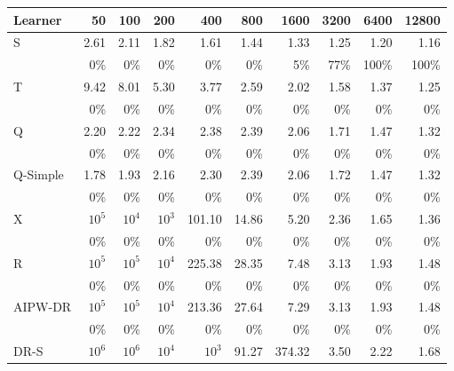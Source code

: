 \begin{tabular}{l|rrrrrrrrr}
\hline
Learner & 50 & 100 & 200 & 400 & 800 & 1600 & 3200 & 6400 & 12800 \\
\hline
S & 2.61 & 2.11 & 1.82 & 1.61 & 1.44 & 1.33 & 1.25 & 1.20 & 1.16 \\
 & \scriptsize 0\% & \scriptsize 0\% & \scriptsize 0\% & \scriptsize 0\% & \scriptsize 0\% & \scriptsize 5\% & \scriptsize 77\% & \scriptsize 100\% & \scriptsize 100\% \\[2pt]
T & 9.42 & 8.01 & 5.30 & 3.77 & 2.59 & 2.02 & 1.58 & 1.37 & 1.25 \\
 & \scriptsize 0\% & \scriptsize 0\% & \scriptsize 0\% & \scriptsize 0\% & \scriptsize 0\% & \scriptsize 0\% & \scriptsize 0\% & \scriptsize 0\% & \scriptsize 0\% \\[2pt]
\hline
Q & 2.20 & 2.22 & 2.34 & 2.38 & 2.39 & 2.06 & 1.71 & 1.47 & 1.32 \\
 & \scriptsize 0\% & \scriptsize 0\% & \scriptsize 0\% & \scriptsize 0\% & \scriptsize 0\% & \scriptsize 0\% & \scriptsize 0\% & \scriptsize 0\% & \scriptsize 0\% \\[2pt]
Q-Simple & 1.78 & 1.93 & 2.16 & 2.30 & 2.39 & 2.06 & 1.72 & 1.47 & 1.32 \\
 & \scriptsize 0\% & \scriptsize 0\% & \scriptsize 0\% & \scriptsize 0\% & \scriptsize 0\% & \scriptsize 0\% & \scriptsize 0\% & \scriptsize 0\% & \scriptsize 0\% \\[2pt]
\hline
X & $10^{5}$ & $10^{4}$ & $10^{3}$ & 101.10 & 14.86 & 5.20 & 2.36 & 1.65 & 1.36 \\
 & \scriptsize 0\% & \scriptsize 0\% & \scriptsize 0\% & \scriptsize 0\% & \scriptsize 0\% & \scriptsize 0\% & \scriptsize 0\% & \scriptsize 0\% & \scriptsize 0\% \\[2pt]
R & $10^{5}$ & $10^{5}$ & $10^{4}$ & 225.38 & 28.35 & 7.48 & 3.13 & 1.93 & 1.48 \\
 & \scriptsize 0\% & \scriptsize 0\% & \scriptsize 0\% & \scriptsize 0\% & \scriptsize 0\% & \scriptsize 0\% & \scriptsize 0\% & \scriptsize 0\% & \scriptsize 0\% \\[2pt]
AIPW-DR & $10^{5}$ & $10^{5}$ & $10^{4}$ & 213.36 & 27.64 & 7.29 & 3.13 & 1.93 & 1.48 \\
 & \scriptsize 0\% & \scriptsize 0\% & \scriptsize 0\% & \scriptsize 0\% & \scriptsize 0\% & \scriptsize 0\% & \scriptsize 0\% & \scriptsize 0\% & \scriptsize 0\% \\[2pt]
\hline
DR-S & $10^{6}$ & $10^{6}$ & $10^{4}$ & $10^{3}$ & 91.27 & 374.32 & 3.50 & 2.22 & 1.68 \\

\end{tabular}
